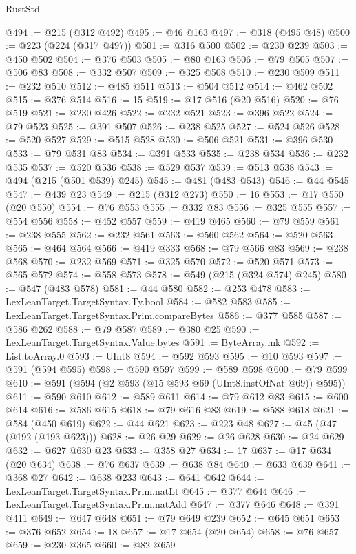 \begin{lexlean}{RustStd}
\begin{coremodule}
@494 := @215 (@312 @492)
@495 := @46 @163
@497 := @318 (@495 @48)
@500 := @223 (@224 (@317 @497))
@501 := @316 @500
@502 := @230 @239
@503 := @450 @502
@504 := @376 @503
@505 := @80 @163
@506 := @79 @505
@507 := @506 @83
@508 := @332 @507
@509 := @325 @508
@510 := @230 @509
@511 := @232 @510
@512 := @485 @511
@513 := @504 @512
@514 := @462 @502
@515 := @376 @514
@516 := 15
@519 := @17 @516 (@20 @516)
@520 := @76 @519
@521 := @230 @426
@522 := @232 @521
@523 := @396 @522
@524 := @79 @523
@525 := @391 @507
@526 := @238 @525
@527 := @524 @526
@528 := @520 @527
@529 := @515 @528
@530 := @506 @521
@531 := @396 @530
@533 := @79 @531 @83
@534 := @391 @533
@535 := @238 @534
@536 := @232 @535
@537 := @520 @536
@538 := @529 @537
@539 := @513 @538
@543 := @494 (@215 (@501 @539) @245)
@545 := @481 (@483 @543)
@546 := @44 @545
@547 := @439 @23
@549 := @215 (@312 @273)
@550 := 16
@553 := @17 @550 (@20 @550)
@554 := @76 @553
@555 := @332 @83
@556 := @325 @555
@557 := @554 @556
@558 := @452 @557
@559 := @419 @465
@560 := @79 @559
@561 := @238 @555
@562 := @232 @561
@563 := @560 @562
@564 := @520 @563
@565 := @464 @564
@566 := @419 @333
@568 := @79 @566 @83
@569 := @238 @568
@570 := @232 @569
@571 := @325 @570
@572 := @520 @571
@573 := @565 @572
@574 := @558 @573
@578 := @549 (@215 (@324 @574) @245)
@580 := @547 (@483 @578)
@581 := @44 @580
@582 := @253 @478
@583 := LexLeanTarget.TargetSyntax.Ty.bool
@584 := @582 @583
@585 := LexLeanTarget.TargetSyntax.Prim.compareBytes
@586 := @377 @585
@587 := @586 @262
@588 := @79 @587
@589 := @380 @25
@590 := LexLeanTarget.TargetSyntax.Value.bytes
@591 := ByteArray.mk
@592 := List.toArray.{0}
@593 := UInt8
@594 := @592 @593
@595 := @10 @593
@597 := @591 (@594 @595)
@598 := @590 @597
@599 := @589 @598
@600 := @79 @599
@610 := @591 (@594 (@2 @593 (@15 @593 @69 (UInt8.instOfNat @69)) @595))
@611 := @590 @610
@612 := @589 @611
@614 := @79 @612 @83
@615 := @600 @614
@616 := @586 @615
@618 := @79 @616 @83
@619 := @588 @618
@621 := @584 (@450 @619)
@622 := @44 @621
@623 := @223 @48
@627 := @45 (@47 (@192 (@193 @623)))
@628 := @26 @29
@629 := @26 @628
@630 := @24 @629
@632 := @627 @630 @23
@633 := @358 @27
@634 := 17
@637 := @17 @634 (@20 @634)
@638 := @76 @637
@639 := @638 @84
@640 := @633 @639
@641 := @368 @27
@642 := @638 @233
@643 := @641 @642
@644 := LexLeanTarget.TargetSyntax.Prim.natLt
@645 := @377 @644
@646 := LexLeanTarget.TargetSyntax.Prim.natAdd
@647 := @377 @646
@648 := @391 @411
@649 := @647 @648
@651 := @79 @649 @239
@652 := @645 @651
@653 := @376 @652
@654 := 18
@657 := @17 @654 (@20 @654)
@658 := @76 @657
@659 := @230 @365
@660 := @82 @659

\end{coremodule}
\end{lexlean}
